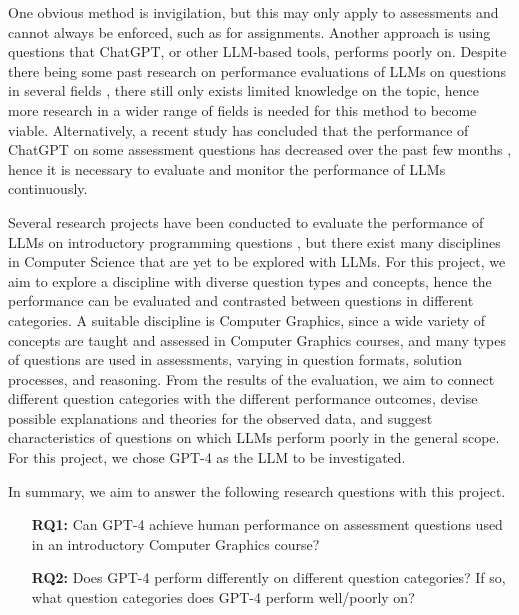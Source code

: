 \documentclass[sigconf,authordraft]{acmart}
\begin{document}
One obvious method is invigilation, but this may only apply to assessments and cannot always be enforced, such as for assignments. Another approach is using questions that ChatGPT, or other LLM-based tools, performs poorly on. Despite there being some past research on performance evaluations of LLMs on questions in several fields \cite{testcodex, testcopilot, testgpt, testbar, testmed}, there still only exists limited knowledge on the topic, hence more research in a wider range of fields is needed for this method to become viable. Alternatively, a recent study has concluded that the performance of ChatGPT on some assessment questions has decreased over the past few months \cite{gptworse}, hence it is necessary to evaluate and monitor the performance of LLMs continuously.

Several research projects have been conducted to evaluate the performance of LLMs on introductory programming questions \cite{testcodex, testcopilot, testgpt}, but there exist many disciplines in Computer Science that are yet to be explored with LLMs. For this project, we aim to explore a discipline with diverse question types and concepts, hence the performance can be evaluated and contrasted between questions in different categories. A suitable discipline is Computer Graphics, since a wide variety of concepts are taught and assessed in Computer Graphics courses, and many types of questions are used in assessments, varying in question formats, solution processes, and reasoning. From the results of the evaluation, we aim to connect different question categories with the different performance outcomes, devise possible explanations and theories for the observed data, and suggest characteristics of questions on which LLMs perform poorly in the general scope. For this project, we chose GPT-4 as the LLM to be investigated.

In summary, we aim to answer the following research questions with this project.
\begin{enumerate}
    \item[\textbf{RQ1:}] Can GPT-4 achieve human performance on assessment questions used in an introductory Computer Graphics course?
    \item[\textbf{RQ2:}] Does GPT-4 perform differently on different question categories? If so, what question categories does GPT-4 perform well/poorly on?
\end{enumerate}
\end{document}
